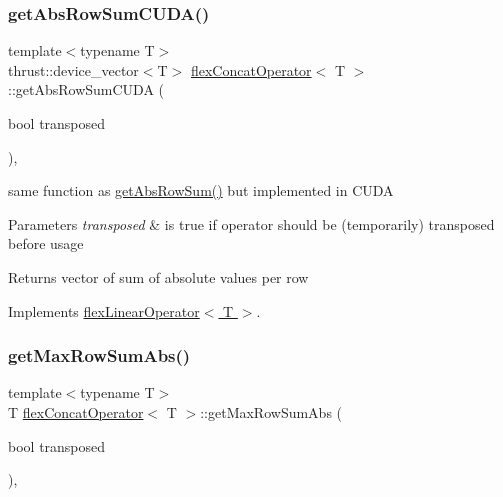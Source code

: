 \subsubsection{\texorpdfstring{get\+Abs\+Row\+Sum\+C\+U\+D\+A()}{getAbsRowSumCUDA()}}
{\footnotesize\ttfamily template$<$typename T$>$ \\
thrust\+::device\+\_\+vector$<$T$>$ \hyperlink{classflex_concat_operator}{flex\+Concat\+Operator}$<$ T $>$\+::get\+Abs\+Row\+Sum\+C\+U\+DA (\begin{DoxyParamCaption}\item[{bool}]{transposed }\end{DoxyParamCaption})\hspace{0.3cm}{\ttfamily [inline]}, {\ttfamily [virtual]}}



same function as \hyperlink{classflex_concat_operator_a6cae0c9545cf1afd8ac0ebc418fa3327}{get\+Abs\+Row\+Sum()} but implemented in C\+U\+DA 


\begin{DoxyParams}{Parameters}
{\em transposed} & is true if operator should be (temporarily) transposed before usage \\
\hline
\end{DoxyParams}
\begin{DoxyReturn}{Returns}
vector of sum of absolute values per row 
\end{DoxyReturn}


Implements \hyperlink{classflex_linear_operator_a0a0a431d43f4f9d36cbee0d31ba5a29b}{flex\+Linear\+Operator$<$ T $>$}.

\mbox{\label{classflex_concat_operator_a39b7aa1797025fb022630a63358a4072}} 
\subsubsection{\texorpdfstring{get\+Max\+Row\+Sum\+Abs()}{getMaxRowSumAbs()}}
{\footnotesize\ttfamily template$<$typename T$>$ \\
T \hyperlink{classflex_concat_operator}{flex\+Concat\+Operator}$<$ T $>$\+::get\+Max\+Row\+Sum\+Abs (\begin{DoxyParamCaption}\item[{bool}]{transposed }\end{DoxyParamCaption})\hspace{0.3cm}{\ttfamily [inline]}, {\ttfamily [virtual]}}



